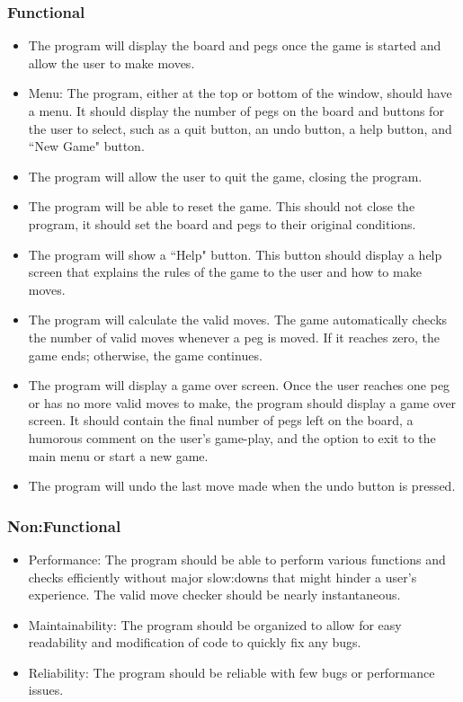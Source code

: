 \documentclass[10pt,conference,onecolumn,compsoc]{IEEEtran}
\begin{document}
\subsubsection{Functional}
\begin{itemize}
\item The program will display the board and pegs once the game is started and allow the user to make moves.
\item Menu: The program, either at the top or bottom of the window, should have a menu. It should display the number of pegs on the board and buttons for the user to select, such as a quit button, an undo button, a help button, and ``New Game" button.
\item The program will allow the user to quit the game, closing the program.
\item The program will be able to reset the game. This should not close the program, it should set the board and pegs to their original conditions.
\item The program will show a ``Help" button. This button should display a help screen that explains the rules of the game to the user and how to make moves.
\item The program will calculate the valid moves. The game automatically checks the number of valid moves whenever a peg is moved. If it reaches zero, the game ends; otherwise, the game continues.
\item The program will display a game over screen. Once the user reaches one peg or has no more valid moves to make, the program should display a game over screen. It should contain the final number of pegs left on the board, a humorous comment on the user's game-play, and the option to exit to the main menu or start a new game.
\item The program will undo the last move made when the undo button is pressed.
\end{itemize}

\subsubsection{Non:Functional}
\begin{itemize}
\item Performance: The program should be able to perform various functions and checks efficiently without major slow:downs that might hinder a user's experience. The valid move checker should be nearly instantaneous.
\item Maintainability: The program should be organized to allow for easy readability and modification of code to quickly fix any bugs.
\item Reliability: The program should be reliable with few bugs or performance issues.
\end{itemize}
\end{document}
